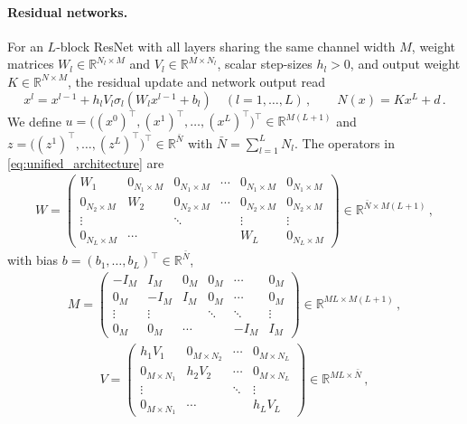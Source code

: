 \paragraph{Residual networks.}
For an $L$-block ResNet \cite{He2016resnet} with all layers sharing the same channel width $M$, weight matrices $W_l \in \mathbb{R}^{N_l \times M}$ and $V_l \in \mathbb{R}^{M \times N_l}$, scalar step-sizes $h_l > 0$, and output weight $K \in \mathbb{R}^{N \times M}$, the residual update and network output read
\begin{equation*}
    x^l = x^{l-1} + h_l V_l \sigma_l(W_l x^{l-1} + b_l) \quad (l=1,\ldots,L) \, , \qquad N(x) = Kx^L + d \, .
\end{equation*}
We define $u = \bigl((x^0)^\top, (x^1)^\top, \ldots, (x^L)^\top\bigr)^\top \in \mathbb{R}^{M(L+1)}$ and $z = \bigl((z^1)^\top, \ldots, (z^L)^\top\bigr)^\top \in \mathbb{R}^{\bar{N}}$ with $\bar{N} = \sum_{l=1}^L N_l$. The operators in \eqref{eq:unified_architecture} are \cite{wang2025unified}
\begin{align*}
    W = \begin{pmatrix}
        W_1 & 0_{N_1 \times M} & 0_{N_1 \times M} & \cdots & 0_{N_1 \times M} & 0_{N_1 \times M} \\
        0_{N_2 \times M} & W_2 & 0_{N_2 \times M} & \cdots & 0_{N_2 \times M} & 0_{N_2 \times M} \\
        \vdots & & \ddots & & \vdots & \vdots \\
        0_{N_L \times M} & \cdots & & & W_L & 0_{N_L \times M}
    \end{pmatrix} \in \mathbb{R}^{\bar{N} \times M(L+1)} \, ,
\end{align*}
with bias $b = (b_1, \ldots, b_L)^\top \in \mathbb{R}^{\bar{N}}$,
\begin{align*}
    M = \begin{pmatrix}
        -I_M & I_M & 0_M & 0_M & \cdots & 0_M \\
        0_M & -I_M & I_M & 0_M & \cdots & 0_M \\
        \vdots & \vdots & & \ddots & \ddots & \vdots \\
        0_M & 0_M & \cdots & & -I_M & I_M
    \end{pmatrix} \in \mathbb{R}^{ML \times M(L+1)} \, ,
\end{align*}
\begin{align*}
    V = \begin{pmatrix}
        h_1 V_1 & 0_{M \times N_2} & \cdots & 0_{M \times N_L} \\
        0_{M \times N_1} & h_2 V_2 & \cdots & 0_{M \times N_L} \\
        \vdots & & \ddots & \vdots \\
        0_{M \times N_1} & \cdots & & h_L V_L
    \end{pmatrix} \in \mathbb{R}^{ML \times \bar{N}} \, ,
\end{align*}
